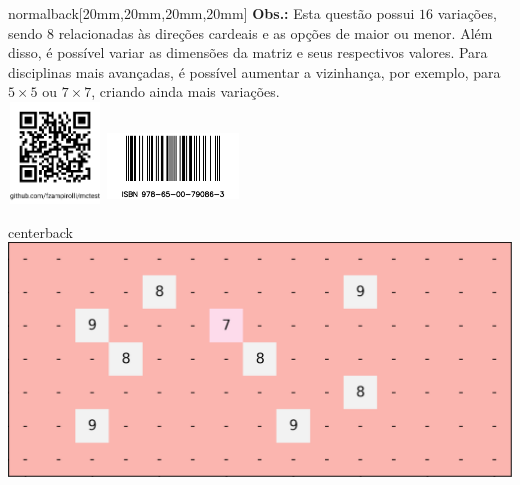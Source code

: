\documentclass[
    coverwidth=21cm,  %
    coverheight=29.7cm, %
    spinewidth=12mm,  %
    ]{bookcover}
\begin{document}
\begin{bookcover}
\begin{bookcoverelement}{normal}{back}[20mm,20mm,20mm,20mm]
\textbf{Obs.:} Esta questão possui $16$ variações, sendo $8$ relacionadas às direções cardeais e as opções de maior ou menor. Além disso, é possível variar as dimensões da matriz e seus respectivos valores. Para disciplinas mais avançadas, é possível aumentar a vizinhança, por exemplo, para $5\times 5$ ou $7\times 7$, criando ainda mais variações.\\[8mm]

    {\centering 
    \includegraphics[height=27mm,width=25mm]{./figures/qrcode.png}\hfill
    \includegraphics[height=20mm,width=35mm]{./figures/barcode-impresso.png}
    }
\end{bookcoverelement}

\begin{bookcoverelement}{center}{back}
    \includegraphics[width=.2\textwidth]{./figures/verso.png}
\end{bookcoverelement}

\end{bookcover}
\end{document}
